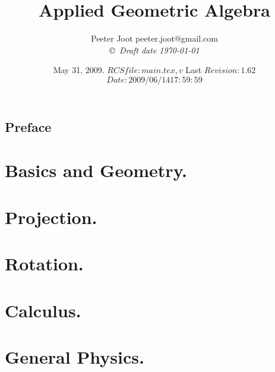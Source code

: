 \documentclass[12pt,leqno]{book}
\title{Applied Geometric Algebra}
\author{Peeter Joot  \quad peeter.joot@gmail.com \\
{\small\em \copyright \  Draft date \today }}
\date{ May 31, 2009.  $RCSfile: main.tex,v $ Last $Revision: 1.62 $ $Date: 2009/06/14 17:59:59 $ }
\begin{document}
\maketitle
\tableofcontents
\listoffigures
\listoftables
\chapter*{Preface}\normalsize
\pagestyle{plain}


\pagestyle{headings}


\part{Basics and Geometry.}



















\part{Projection.}







\part{Rotation.}





\part{Calculus.}






\part{General Physics.}









\end{document}
